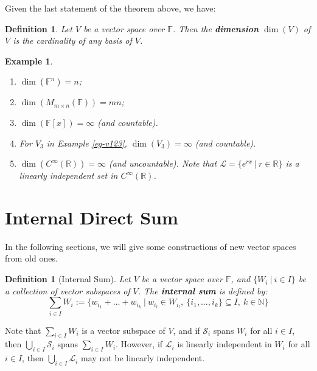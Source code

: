 \documentclass[12pt]{amsbook}
\newtheorem{definition}[theorem]{Definition}
\newtheorem{example}[theorem]{Example}
\begin{document}
Given the last statement of the theorem above, we have:
\begin{definition}
    Let $V$ be a vector space over $\mathbb{F}$. Then the {\bf dimension} $\dim(V)$ of $V$ is the cardinality of any basis of $V$.
\end{definition}
\begin{example}
\begin{enumerate}
    \item $\dim(\mathbb{F}^n) = n$; 
    \item $\dim(M_{m \times n}(\mathbb{F})) = mn$;
    \item $\dim(\mathbb{F}[x]) = \infty$ (and countable).
    \item For $V_3$ in Example \ref{eg-v123}, $\dim(V_3) = \infty$ (and countable).
    \item $\dim(C^{\infty}(\mathbb{R})) = \infty$ (and uncountable). Note that $\mathcal{L} = \{e^{rx}\ |\ r \in \mathbb{R}\}$ is a linearly independent set in $C^{\infty}(\mathbb{R})$.
\end{enumerate}
\end{example}

\section{Internal Direct Sum}
In the following sections, we will give some constructions of new vector spaces from old ones.

\begin{definition}[Internal Sum]
    Let $V$ be a vector space over $\mathbb{F}$, and $\{W_i\ |\ i \in I\}$ be a collection of vector subspaces of $V$. The {\bf internal sum} is defined by:
    $$\sum_{i \in I} W_i := \{w_{i_1} + \dots + w_{i_k}\ |\ w_{i_l} \in W_{i_l},\ \{i_1, \dots, i_k\}\subseteq I,\ k \in \mathbb{N}\}$$
\end{definition}

Note that $\sum_{i \in I} W_i$ is a vector subspace of $V$, and if $\mathcal{S}_i$ spans $W_i$ for all $i \in I$, then $\bigcup_{i \in I} \mathcal{S}_i$ spans $\sum_{i \in I} W_i$. However, if $\mathcal{L}_i$ is linearly independent in $W_i$ for all $i \in I$, then $\bigcup_{i \in I} \mathcal{L}_i$ may not be linearly independent.
\end{document}
